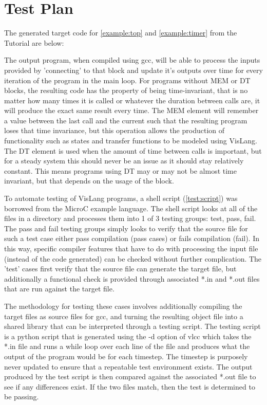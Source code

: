 \section{Test Plan}

The generated target code for \autoref{example:top} and \autoref{example:timer}
from the Tutorial are below:


The output program, when compiled using gcc, will be able to process the inputs provided
by 'connecting' to that block and update it's outputs over time for every iteration of
the program in the main loop. For programs without MEM or DT blocks, the resulting code
has the property of being time-invariant, that is no matter how many times it is called
or whatever the duration between calls are, it will produce the exact same result every
time. The MEM element will remember a value between the last call and the current such
that the resulting program loses that time invariance, but this operation allows the
production of functionality such as states and transfer functions to be modeled using
VisLang. The DT element is used when the amount of time between calls is important,
but for a steady system this should never be an issue as it should stay relatively
constant. This means programs using DT may or may not be almost time invariant, but
that depends on the usage of the block.
\par
To automate testing of VisLang programs, a shell script (\autoref{test:script}) was
borrowed from the MicroC example language. The shell script looks at all of the files
in a directory and processes them into 1 of 3 testing groups: test, pass, fail. The pass
and fail testing groups simply looks to verify that the source file for such a test case
either pass compilation (pass cases) or fails compilation (fail). In this way, specific
compiler features that have to do with processing the input file (instead of the code
generated) can be checked without further complication. The 'test' cases first verify that
the source file can generate the target file, but additionally a functional check is
provided through associated *.in and *.out files that are run against the target file.
\par
The methodology for testing these cases involves additionally compiling the target files
as source files for gcc, and turning the resulting object file into a shared library that
can be interpreted through a testing script. The testing script is a python script that
is generated using the -d option of vlcc which takes the *.in file and runs a while loop
over each line of the file and produces what the output of the program would be for each
timestep. The timestep is purposely never updated to ensure that a repeatable test
environment exists. The output produced by the test script is then compared against the
associated *.out file to see if any differences exist. If the two files match, then the
test is determined to be passing.

